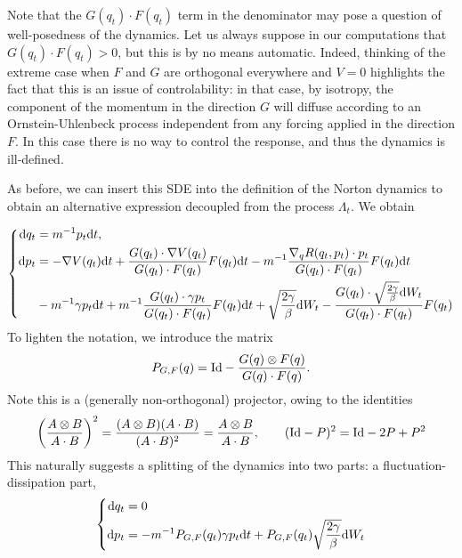 \begin{remark}
    \label{rem:norton_sv_well_posedness}
    Note that the $G(q_t)\cdot F(q_t)$ term in the denominator may pose a question of well-posedness of the dynamics. Let us always suppose in our computations that $G(q_t)\cdot F(q_t)>0$, but this is by no means automatic.
    Indeed, thinking of the extreme case when $F$ and $G$ are orthogonal everywhere and $V=0$ highlights the fact that this is an issue of controlability: in that case, by isotropy, the component of the momentum in the direction $G$ will diffuse according to an Ornstein-Uhlenbeck process independent from any forcing applied in the direction $F$. In this case there is no way to control the response, and thus the dynamics is ill-defined. 
\end{remark}
As before, we can insert this SDE into the definition of the Norton dynamics to obtain
an alternative expression decoupled from the process $\Lambda_t$. We obtain

\begin{equation}
    \label{eq:norton_sv_dynamics_solved}
    \left\{
        \begin{aligned}
            \mathrm{d} q_t &= m^{-1}p_t\mathrm{d} t,\\
            \mathrm{d} p_t &= -\nabla V(q_t)\mathrm{d} t +\frac{G(q_t)\cdot \nabla V(q_t)}{G(q_t)\cdot F(q_t)}F(q_t)\mathrm{d} t-m^{-1}\frac{\nabla_q R(q_t,p_t)\cdot p_t}{G(q_t)\cdot F(q_t)}F(q_t)\mathrm{d} t\\
            &-m^{-1}\gamma p_t\mathrm{d} t+m^{-1}\frac{G(q_t)\cdot \gamma p_t}{G(q_t)\cdot F(q_t)}F(q_t)\mathrm{d} t+\sqrt{\frac{2\gamma}{\beta}}\mathrm{d} W_t-\frac{G(q_t)\cdot \sqrt{\frac{2\gamma}{\beta}}\mathrm{d} W_t}{G(q_t)\cdot F(q_t)}F(q_t)\\
                \end{aligned}
    \right.
\end{equation}
To lighten the notation, we introduce the matrix
\begin{equation}
    \label{eq:norton_sv_M_definition}
    P_{G,F}(q)=\mathrm{Id}-\frac{G(q)\otimes F(q)}{G(q)\cdot F(q)}.
\end{equation}
Note this is a (generally non-orthogonal) projector, owing to the identities
\[\left(\frac{A\otimes B}{A\cdot B}\right)^2=\frac{(A\otimes B)(A\cdot B)}{(A\cdot B)^2}=\frac{A\otimes B}{A\cdot B},\qquad (\mathrm{Id}-P)^2=\mathrm{Id}-2P+P^2\]
This naturally suggests a splitting of the dynamics into two parts: a fluctuation-dissipation part,
\begin{equation}
    \label{eq:norton_sv_fd_part}
    \left\{\begin{aligned}
        \mathrm{d} q_t&=0\\
        \mathrm{d} p_t&=-m^{-1}P_{G,F}(q_t)\gamma p_t\mathrm{d} t+P_{G,F}(q_t)\sqrt{\frac{2\gamma}{\beta}}\mathrm{d} W_t
    \end{aligned}\right.
\end{equation}

